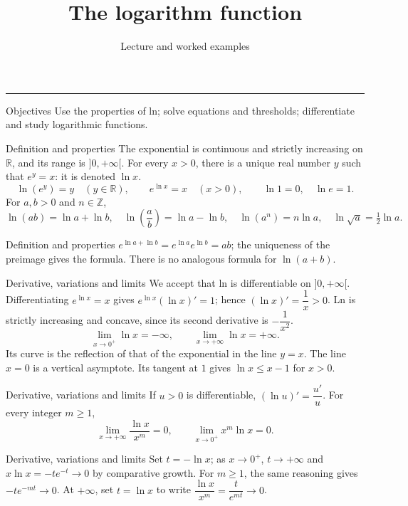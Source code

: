 \documentclass[aspectratio=169,10pt]{beamer}
\title{The logarithm function}
\subtitle{Lecture and worked examples}
\date{}
\author{}
\providecommand{\Z}{\mathbb{Z}}
\providecommand{\R}{\mathbb{R}}
\begin{document}
\begin{frame}[plain]
\vfill
{\inserttitle\par}
\medskip
{\insertsubtitle\par}
\medskip
{\rule{\textwidth}{.5pt}}
\vfill
\end{frame}
\begin{frame}{Objectives}
Use the properties of ln; solve equations and thresholds; differentiate and study logarithmic functions.
\end{frame}
\begin{frame}{Definition and properties}
The exponential is continuous and strictly increasing on \(\R\), and its range is \(]0,+\infty[\). For every \(x>0\), there is a unique real number \(y\) such that \(e^y=x\): it is denoted \(\ln x\).
\[\ln(e^y)=y\quad(y\in\R),\qquad e^{\ln x}=x\quad(x>0),\qquad\ln1=0,\quad\ln e=1.\]
For \(a,b>0\) and \(n\in\Z\),
\[\ln (ab)=\ln a+\ln b,\quad\ln (\dfrac{a}{b})=\ln a-\ln b,\quad\ln (a^n)=n\ln a,\quad\ln \sqrt{a}=\tfrac{1}{2}\ln a.\]
\end{frame}
\begin{frame}{Definition and properties}
\(e^{\ln a+\ln b}=e^{\ln a}e^{\ln b}=ab\); the uniqueness of the preimage gives the formula. There is no analogous formula for \(\ln(a+b)\).
\end{frame}
\begin{frame}{Derivative, variations and limits}
We accept that ln is differentiable on \(]0,+\infty[\). Differentiating \(e^{\ln x}=x\) gives \(e^{\ln x}(\ln x)'=1\); hence \((\ln x)'=\dfrac{1}{x}>0\). Ln is strictly increasing and concave, since its second derivative is \(-\dfrac{1}{x^2}\).
\[\lim_{x\to0^+}\ln x=-\infty,\qquad\lim_{x\to+\infty}\ln x=+\infty.\]
Its curve is the reflection of that of the exponential in the line \(y=x\). The line \(x=0\) is a vertical asymptote. Its tangent at \(1\) gives \(\ln x\le x-1\) for \(x>0\).
\end{frame}
\begin{frame}{Derivative, variations and limits}
If \(u>0\) is differentiable, \((\ln u)'=\dfrac{u'}{u}\). For every integer \(m\ge1\),
\[\lim_{x\to+\infty}\dfrac{\ln x}{x^m}=0,\qquad\lim_{x\to0^+}x^m\ln x=0.\]
\end{frame}
\begin{frame}{Derivative, variations and limits}
Set \(t=-\ln x\); as \(x\to0^+\), \(t\to+\infty\) and \(x\ln x=-te^{-t}\to0\) by comparative growth. For \(m\ge1\), the same reasoning gives \(-te^{-mt}\to0\). At \(+\infty\), set \(t=\ln x\) to write \(\dfrac{\ln x}{x^m}=\dfrac{t}{e^{mt}}\to0\).
\end{frame}
\end{document}
